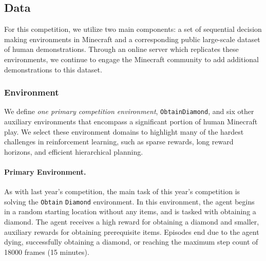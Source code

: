 \subsection{Data}\label{sec:data}

For this competition, we utilize two main components: a set of sequential decision making environments in Minecraft and a corresponding public large-scale dataset of human demonstrations. Through an online server which replicates these environments, we continue to engage the Minecraft community to add additional demonstrations to this dataset.

\subsubsection{Environment}

We define \emph{one primary competition environment}, \texttt{ObtainDiamond}, and six other auxiliary environments that encompass a significant portion of human Minecraft play. 
We select these environment domains to highlight many of the hardest challenges in reinforcement learning, such as sparse rewards, long reward horizons, and efficient hierarchical planning.


\paragraph{Primary Environment.}
As with last year's competition, the main task of this year's competition is solving the \texttt{Obtain} \texttt{Diamond} environment. 
In this environment, the agent begins in a random starting location without any items, and is tasked with obtaining a diamond. 
The agent receives a high reward for obtaining a diamond and smaller, auxiliary rewards for obtaining prerequisite items. 
Episodes end due to the agent dying, successfully obtaining a diamond, or reaching the maximum step count of 18000 frames (15 minutes).


